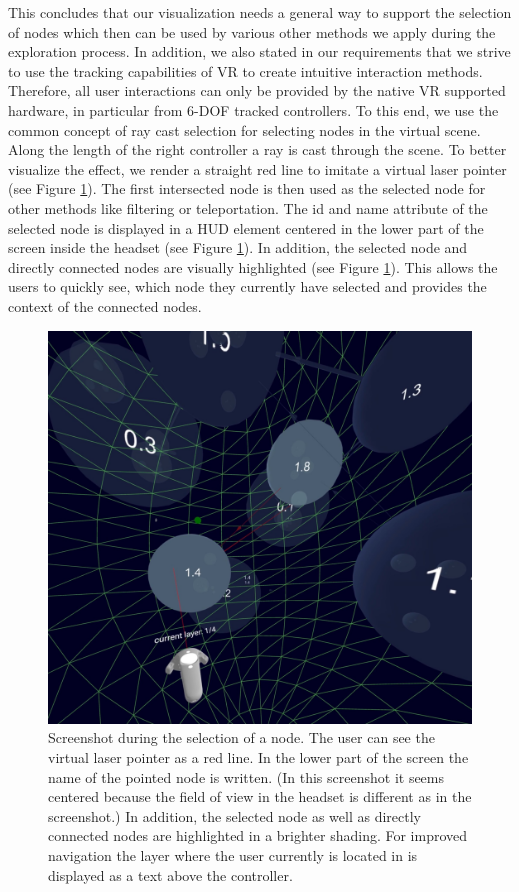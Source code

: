 This concludes that our visualization needs a general way to support the selection of nodes which then can be used by various other methods we apply during the exploration process. 
In addition, we also stated in our requirements that we strive to use the tracking capabilities of VR to create intuitive interaction methods.
Therefore, all user interactions can only be provided by the native VR supported hardware, in particular from 6-DOF tracked controllers. 
To this end, we use the common concept of ray cast selection for selecting nodes in the virtual scene. Along the length of the right controller a ray is cast through the scene. 
To better visualize the effect, we render a straight red line to imitate a virtual laser pointer (see Figure \ref{fig:screenshot_interaction}). 
The first intersected node is then used as the selected node for other methods like filtering or teleportation. The id and name attribute of the selected node is displayed in a HUD element centered in the lower part of the screen inside the headset (see Figure \ref{fig:screenshot_interaction}). 
In addition, the selected node and directly connected nodes are visually highlighted (see Figure \ref{fig:screenshot_interaction}). This allows the users to quickly see, which node they currently have selected and provides the context of the connected nodes.

\begin{figure}[h]
    \centering
    \includegraphics[width=1\textwidth]{graphics/screenShotFilteringNodes2.jpg}
    \caption[Screenshot during the selection of a node.]{Screenshot during the selection of a node. The user can see the virtual laser pointer as a red line. 
    In the lower part of the screen the name of the pointed node is written. (In this screenshot it seems centered because the field of view in the headset is different as in the screenshot.)    
    In addition, the selected node as well as directly connected nodes are highlighted in a brighter shading. For improved navigation the layer where the user currently is located in is displayed as a text above the controller.} 
    \label{fig:screenshot_interaction} 
\end{figure}

